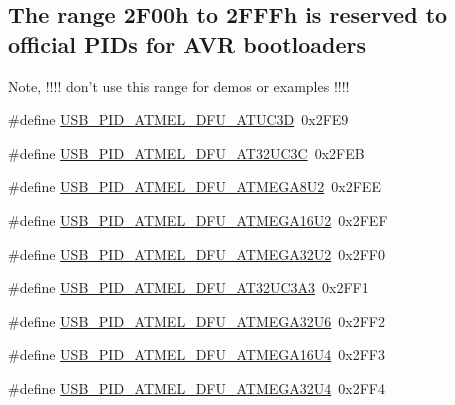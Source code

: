 \subsection*{\-The range 2\-F00h to 2\-F\-F\-Fh is reserved to official \-P\-I\-Ds for \-A\-V\-R bootloaders}
\label{_amgrp63dd31be8a71af76335a6cb0fbb010df}%
 \-Note, !!!! don't use this range for demos or examples !!!! \begin{DoxyCompactItemize}
\item 
\#define \hyperlink{group__usb__atmel__ids__group_ga173d2e0215c7d3184388097e541e8dad}{\-U\-S\-B\-\_\-\-P\-I\-D\-\_\-\-A\-T\-M\-E\-L\-\_\-\-D\-F\-U\-\_\-\-A\-T\-U\-C3\-D}~0x2\-F\-E9
\item 
\#define \hyperlink{group__usb__atmel__ids__group_ga59330b9a02bf3b9bea68ee373183e041}{\-U\-S\-B\-\_\-\-P\-I\-D\-\_\-\-A\-T\-M\-E\-L\-\_\-\-D\-F\-U\-\_\-\-A\-T32\-U\-C3\-C}~0x2\-F\-E\-B
\item 
\#define \hyperlink{group__usb__atmel__ids__group_ga68f5b8a39ac712a611f1140d80b9b58c}{\-U\-S\-B\-\_\-\-P\-I\-D\-\_\-\-A\-T\-M\-E\-L\-\_\-\-D\-F\-U\-\_\-\-A\-T\-M\-E\-G\-A8\-U2}~0x2\-F\-E\-E
\item 
\#define \hyperlink{group__usb__atmel__ids__group_ga208651a2d251f01e52d9b7c51b6f9250}{\-U\-S\-B\-\_\-\-P\-I\-D\-\_\-\-A\-T\-M\-E\-L\-\_\-\-D\-F\-U\-\_\-\-A\-T\-M\-E\-G\-A16\-U2}~0x2\-F\-E\-F
\item 
\#define \hyperlink{group__usb__atmel__ids__group_gacd8db8dbfd7130716e4bee4606ab8729}{\-U\-S\-B\-\_\-\-P\-I\-D\-\_\-\-A\-T\-M\-E\-L\-\_\-\-D\-F\-U\-\_\-\-A\-T\-M\-E\-G\-A32\-U2}~0x2\-F\-F0
\item 
\#define \hyperlink{group__usb__atmel__ids__group_gaa11f6d95a0888b0f8defad9cbf78fc65}{\-U\-S\-B\-\_\-\-P\-I\-D\-\_\-\-A\-T\-M\-E\-L\-\_\-\-D\-F\-U\-\_\-\-A\-T32\-U\-C3\-A3}~0x2\-F\-F1
\item 
\#define \hyperlink{group__usb__atmel__ids__group_gaffc46609cff6a77aeb4393e31feaea05}{\-U\-S\-B\-\_\-\-P\-I\-D\-\_\-\-A\-T\-M\-E\-L\-\_\-\-D\-F\-U\-\_\-\-A\-T\-M\-E\-G\-A32\-U6}~0x2\-F\-F2
\item 
\#define \hyperlink{group__usb__atmel__ids__group_ga2d071c4d544362684d714866bcf71543}{\-U\-S\-B\-\_\-\-P\-I\-D\-\_\-\-A\-T\-M\-E\-L\-\_\-\-D\-F\-U\-\_\-\-A\-T\-M\-E\-G\-A16\-U4}~0x2\-F\-F3
\item 
\#define \hyperlink{group__usb__atmel__ids__group_gacc8564e7fe5ed97397f9e29bb1dd1da6}{\-U\-S\-B\-\_\-\-P\-I\-D\-\_\-\-A\-T\-M\-E\-L\-\_\-\-D\-F\-U\-\_\-\-A\-T\-M\-E\-G\-A32\-U4}~0x2\-F\-F4
\item 

\end{DoxyCompactItemize}
